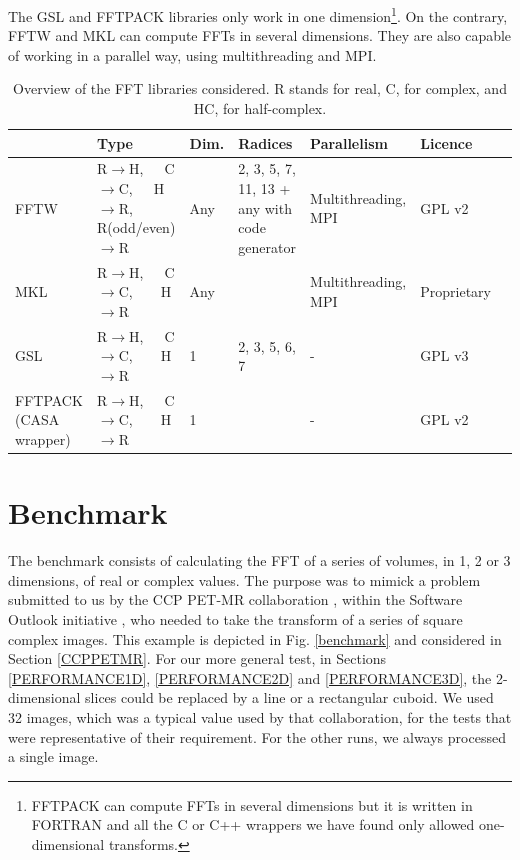 \documentclass[12pt, a4paper]{article}
\begin{document}
The GSL and FFTPACK libraries only work in one dimension\footnote{FFTPACK can compute FFTs in several dimensions but it is written in FORTRAN and all the C or C++ wrappers we have found only allowed one-dimensional transforms.}. On the contrary, FFTW and MKL can compute FFTs in several dimensions. They are also capable of working in a parallel way, using multithreading and MPI.  
\begin{table}[H]
\captionsetup{width=1\textwidth}
\begin{tabular}{|p{2.5cm}||p{2.5cm}|p{1cm}|p{3cm}|p{3cm}|p{2cm}|p{2cm}|}
\hline
& Type & Dim. & Radices & Parallelism & Licence \\
\hline
\hline
FFTW & R$\to$H,\ \ \  C$\to$C,\ \ \  H$\to$R, R{\scriptsize (odd/even)}$\to$R& Any&2, 3, 5, 7, 11, 13 + any with code generator & Multithreading, MPI & GPL v2\\
\hline
MKL  &  R$\to$H,\ \ \  C$\to$C,\ \ \ \  H$\to$R& Any & & Multithreading, MPI & Proprietary\\
\hline
GSL  &  R$\to$H,\ \ \  C$\to$C,\ \ \ \  H$\to$R & 1 & 2, 3, 5, 6, 7 & - & GPL v3\\
\hline
FFTPACK {\scriptsize (CASA wrapper)} &  R$\to$H,\ \ \  C$\to$C,\ \ \ \  H$\to$R & 1 & & - & GPL v2\\
\hline
\end{tabular}
\caption{Overview of the FFT libraries considered. R stands for real, C, for complex, and HC, for half-complex.}
\label{ffttable}
\end{table}
\section{Benchmark}
The benchmark \cite{code} consists of calculating the FFT of a series of volumes, in 1, 2 or 3 dimensions, of real or complex values. The purpose was to mimick a problem submitted to us by the CCP PET-MR collaboration \cite{ccppetmr}, within the Software Outlook initiative \cite{softwareoutlook}, who needed to take the transform of a series of square complex images. This example is depicted in Fig. \ref{benchmark} and considered in Section \ref{CCPPETMR}. For our more general test, in Sections \ref{PERFORMANCE1D}, \ref{PERFORMANCE2D} and \ref{PERFORMANCE3D}, the 2-dimensional slices could be replaced by a line or a rectangular cuboid. We used 32 images, which was a typical value used by that collaboration, for the tests that were representative of their requirement. For the other runs, we always processed a single image.\\
\end{document}
